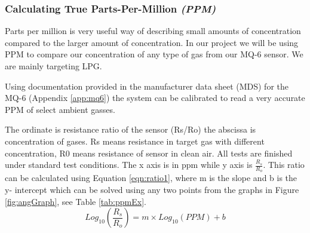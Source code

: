 			\subsubsection{Calculating True Parts-Per-Million \textit{(PPM)}}
				\par Parts per million is very useful way of describing small amounts of concentration compared to the larger amount of concentration. In our project we will be using PPM to compare our concentration of any type of gas from our MQ-6 sensor. We are mainly targeting LPG.
				\par Using documentation provided in the manufacturer data sheet (MDS) for the MQ-6 (Appendix \ref{app:mq6}) the system can be calibrated to read a very accurate PPM of select ambient gasses.
				
				\par The ordinate is resistance ratio of the sensor (Rs/Ro)  the abscissa is concentration of gases. Rs means resistance in target gas with different concentration, R0 means resistance of sensor in clean air. All tests are finished under standard test conditions. The x axis is in ppm while y axis is $\frac{R_s}{R_o}$. This ratio can be calculated using Equation \ref{eqn:ratio1}, where m is the slope and b is the y- intercept which can be solved using any two points from the graphs in Figure \ref{fig:angGraph}, see Table \ref{tab:ppmEx}. \\
				\begin{equation}
				Log_10(\frac{R_s}{R_o}) = m\times Log_10(PPM) + b
				\label{eqn:ratio1}
				\end{equation}
				
